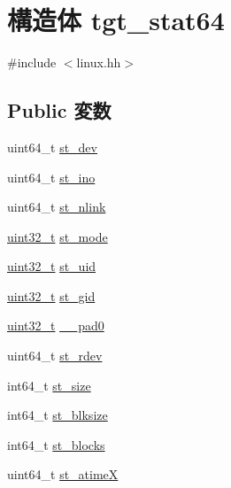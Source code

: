 \hypertarget{structX86Linux64_1_1tgt__stat64}{
\section{構造体 tgt\_\-stat64}
\label{structX86Linux64_1_1tgt__stat64}
}


{\ttfamily \#include $<$linux.hh$>$}\subsection*{Public 変数}
\begin{DoxyCompactItemize}
\item 
uint64\_\-t \hyperlink{structX86Linux64_1_1tgt__stat64_a0146849d3da5c91d9776888b14b82dcc}{st\_\-dev}
\item 
uint64\_\-t \hyperlink{structX86Linux64_1_1tgt__stat64_abb54f0e7d91659ba9f4ab77a5392c08a}{st\_\-ino}
\item 
uint64\_\-t \hyperlink{structX86Linux64_1_1tgt__stat64_abef7057bf9bf605a14cd64d34cf3424d}{st\_\-nlink}
\item 
\hyperlink{Type_8hh_a435d1572bf3f880d55459d9805097f62}{uint32\_\-t} \hyperlink{structX86Linux64_1_1tgt__stat64_a75f55d064ed3b380b0315de36e178885}{st\_\-mode}
\item 
\hyperlink{Type_8hh_a435d1572bf3f880d55459d9805097f62}{uint32\_\-t} \hyperlink{structX86Linux64_1_1tgt__stat64_ad5477a292a4edf27aa5766e01e0f5d1f}{st\_\-uid}
\item 
\hyperlink{Type_8hh_a435d1572bf3f880d55459d9805097f62}{uint32\_\-t} \hyperlink{structX86Linux64_1_1tgt__stat64_a1faa6012541b83fd5218e2b229f876ec}{st\_\-gid}
\item 
\hyperlink{Type_8hh_a435d1572bf3f880d55459d9805097f62}{uint32\_\-t} \hyperlink{structX86Linux64_1_1tgt__stat64_a8a67e7e5a583fb9e94edf6f27d30cb09}{\_\-\_\-pad0}
\item 
uint64\_\-t \hyperlink{structX86Linux64_1_1tgt__stat64_ac430407fd3b0e421da1ee8f66c95a786}{st\_\-rdev}
\item 
int64\_\-t \hyperlink{structX86Linux64_1_1tgt__stat64_aec608d79c93ed6d010aec9f7487e0064}{st\_\-size}
\item 
int64\_\-t \hyperlink{structX86Linux64_1_1tgt__stat64_ac645a8ad19dd1edb733afe23f5774130}{st\_\-blksize}
\item 
int64\_\-t \hyperlink{structX86Linux64_1_1tgt__stat64_a9817804f8469f6e886f9b29be9cf9d94}{st\_\-blocks}
\item 
uint64\_\-t \hyperlink{structX86Linux64_1_1tgt__stat64_a6602fcfc6e3137ac04ca7a50efbc3d34}{st\_\-atimeX}

\end{DoxyCompactItemize}
